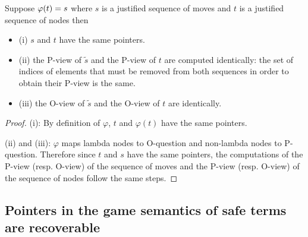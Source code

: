 \begin{property}
\label{proper:phi_pview}
Suppose $\varphi(t) = s$ where $s$ is a justified sequence of moves and
$t$ is a justified sequence of nodes then
\begin{itemize}
\item (i) $s$ and $t$ have the same pointers.
\item (ii) the P-view of $\tilde{s}$ and the P-view of $t$ are computed
identically: the set of indices of elements that must be removed from both sequences
in order to obtain their P-view is the same.
\item (iii) the O-view of $\tilde{s}$ and the O-view of $t$ are identically.
\end{itemize}
\end{property}
\begin{proof}
(i): By definition of $\varphi$, $t$ and $\varphi(t)$ have the same pointers.

(ii) and (iii): $\varphi$ maps lambda nodes to
O-question and non-lambda nodes to P-question. Therefore since $t$ and $s$ have the same
pointers, the computations of the P-view (resp. O-view) of the sequence of moves and the P-view
(resp. O-view) of the sequence of nodes follow the same steps.
\end{proof}

\subsection{Pointers in the game semantics of safe terms are recoverable}

